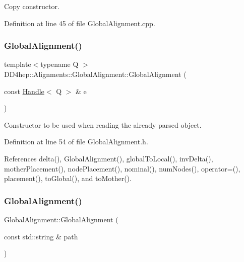 Copy constructor. 



Definition at line 45 of file Global\+Alignment.\+cpp.

\hypertarget{class_d_d4hep_1_1_alignments_1_1_global_alignment_a124efcac78245a83fbd89251af48ef44}{}\label{class_d_d4hep_1_1_alignments_1_1_global_alignment_a124efcac78245a83fbd89251af48ef44} 
\subsubsection{\texorpdfstring{Global\+Alignment()}{GlobalAlignment()}\hspace{0.1cm}{\footnotesize\ttfamily [4/5]}}
{\footnotesize\ttfamily template$<$typename Q $>$ \\
D\+D4hep\+::\+Alignments\+::\+Global\+Alignment\+::\+Global\+Alignment (\begin{DoxyParamCaption}\item[{const \hyperlink{class_d_d4hep_1_1_handle}{Handle}$<$ Q $>$ \&}]{e }\end{DoxyParamCaption})\hspace{0.3cm}{\ttfamily [inline]}}



Constructor to be used when reading the already parsed object. 



Definition at line 54 of file Global\+Alignment.\+h.



References delta(), Global\+Alignment(), global\+To\+Local(), inv\+Delta(), mother\+Placement(), node\+Placement(), nominal(), num\+Nodes(), operator=(), placement(), to\+Global(), and to\+Mother().

\hypertarget{class_d_d4hep_1_1_alignments_1_1_global_alignment_a16080bc886b611de260d54245324c435}{}\label{class_d_d4hep_1_1_alignments_1_1_global_alignment_a16080bc886b611de260d54245324c435} 
\subsubsection{\texorpdfstring{Global\+Alignment()}{GlobalAlignment()}\hspace{0.1cm}{\footnotesize\ttfamily [5/5]}}
{\footnotesize\ttfamily Global\+Alignment\+::\+Global\+Alignment (\begin{DoxyParamCaption}\item[{const std\+::string \&}]{path }\end{DoxyParamCaption})}



